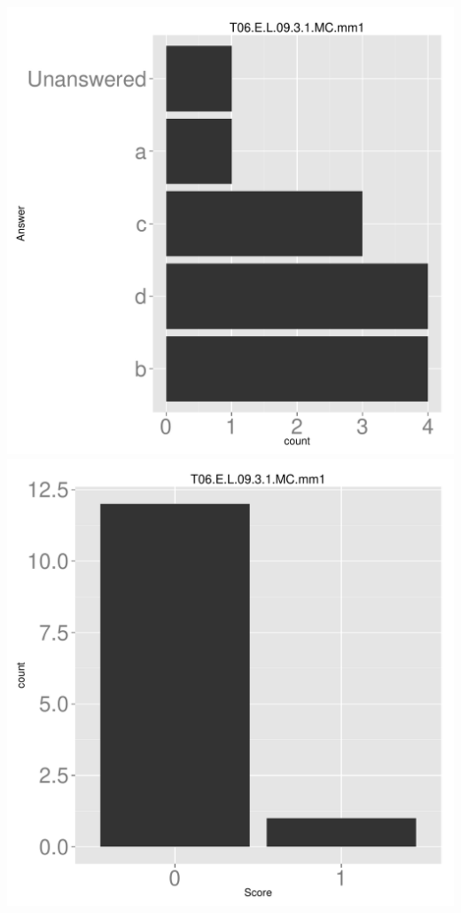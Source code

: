 \documentclass[12pt,english,nohyper]{tufte-handout}\usepackage[]{graphicx}\usepackage[]{color}
\begin{document}
\begin{center} \includegraphics[width=.45\linewidth]{Topic06_AB_39_answer} \includegraphics[width=.45\linewidth]{Topic06_AB_39_score} \end{center} 
\end{document}
